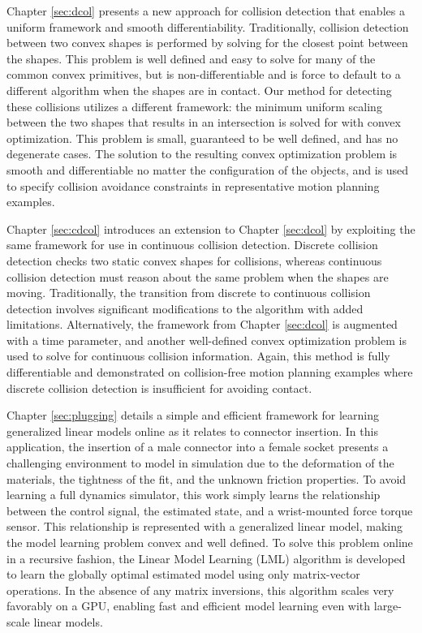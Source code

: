 Chapter \ref{sec:dcol} presents a new approach for collision detection that enables a uniform framework and smooth differentiability. Traditionally, collision detection between two convex shapes is performed by solving for the closest point between the shapes. This problem is well defined and easy to solve for many of the common convex primitives, but is non-differentiable and is force to default to a different algorithm when the shapes are in contact. Our method for detecting these collisions utilizes a different framework: the minimum uniform scaling between the two shapes that results in an intersection is solved for with convex optimization. This problem is small, guaranteed to be well defined, and has no degenerate cases. The solution to the resulting convex optimization problem is smooth and differentiable no matter the configuration of the objects, and is used to specify collision avoidance constraints in representative motion planning examples. 

Chapter \ref{sec:cdcol} introduces an extension to Chapter \ref{sec:dcol} by exploiting the same framework for use in continuous collision detection. Discrete collision detection checks two static convex shapes for collisions, whereas continuous collision detection must reason about the same problem when the shapes are moving. Traditionally, the transition from discrete to continuous collision detection involves significant modifications to the algorithm with added limitations. Alternatively, the framework from Chapter \ref{sec:dcol} is augmented with a time parameter, and another well-defined convex optimization problem is used to solve for continuous collision information. Again, this method is fully differentiable and demonstrated on collision-free motion planning examples where discrete collision detection is insufficient for avoiding contact. 

Chapter \ref{sec:plugging} details a simple and efficient framework for learning generalized linear models online as it relates to connector insertion. In this application, the insertion of a male connector into a female socket presents a challenging environment to model in simulation due to the deformation of the materials, the tightness of the fit, and the unknown friction properties. To avoid learning a full dynamics simulator, this work simply learns the relationship between the control signal, the estimated state, and a wrist-mounted force torque sensor. This relationship is represented with a generalized linear model, making the model learning problem convex and well defined. To solve this problem online in a recursive fashion, the Linear Model Learning (LML) algorithm is developed to learn the globally optimal estimated model using only matrix-vector operations. In the absence of any matrix inversions, this algorithm scales very favorably on a GPU, enabling fast and efficient model learning even with large-scale linear models. 

